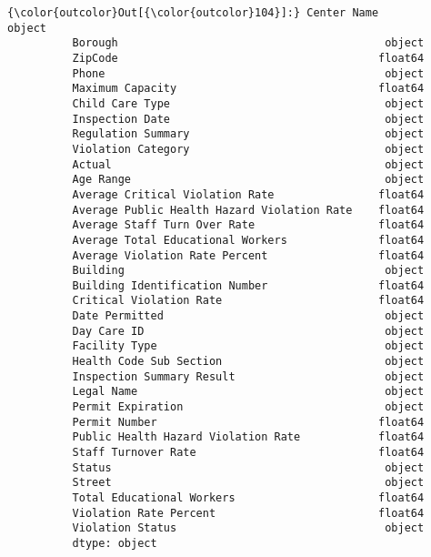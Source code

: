 \documentclass[11pt]{article}
\begin{document}
\begin{Verbatim}[commandchars=\\\{\}]
{\color{outcolor}Out[{\color{outcolor}104}]:} Center Name                                     object
          Borough                                         object
          ZipCode                                        float64
          Phone                                           object
          Maximum Capacity                               float64
          Child Care Type                                 object
          Inspection Date                                 object
          Regulation Summary                              object
          Violation Category                              object
          Actual                                          object
          Age Range                                       object
          Average Critical Violation Rate                float64
          Average Public Health Hazard Violation Rate    float64
          Average Staff Turn Over Rate                   float64
          Average Total Educational Workers              float64
          Average Violation Rate Percent                 float64
          Building                                        object
          Building Identification Number                 float64
          Critical Violation Rate                        float64
          Date Permitted                                  object
          Day Care ID                                     object
          Facility Type                                   object
          Health Code Sub Section                         object
          Inspection Summary Result                       object
          Legal Name                                      object
          Permit Expiration                               object
          Permit Number                                  float64
          Public Health Hazard Violation Rate            float64
          Staff Turnover Rate                            float64
          Status                                          object
          Street                                          object
          Total Educational Workers                      float64
          Violation Rate Percent                         float64
          Violation Status                                object
          dtype: object
\end{Verbatim}
            

    
    
    
    
\end{document}
